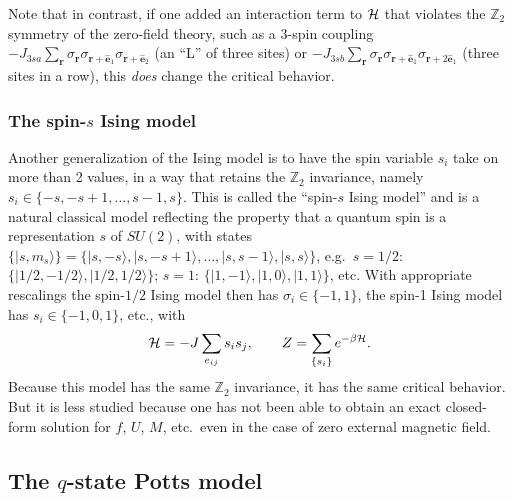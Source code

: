 Note that in contrast, if one added an interaction term to $\mathcal{H}$ that violates the $\mathbb{Z}_2$
symmetry of the zero-field theory, such as a 3-spin coupling
$-J_{3sa}\sum_{\mathbf r}\sigma_{\mathbf r}\sigma_{\mathbf r+\hat{\mathbf e}_1}\sigma_{\mathbf r+\hat{\mathbf e}_2}$
(an ``L'' of three sites) or
$-J_{3sb}\sum_{\mathbf r}\sigma_{\mathbf r}\sigma_{\mathbf r+\hat{\mathbf e}_1}\sigma_{\mathbf r+2\hat{\mathbf e}_1}$
(three sites in a row), this \emph{does} change the critical behavior.

\subsubsection*{The spin-\texorpdfstring{$s$}{s} Ising model}

Another generalization of the Ising model is to have the spin variable $s_i$ take on more than 2 values,
in a way that retains the $\mathbb{Z}_2$ invariance, namely $s_i\in\{-s,-s+1,\ldots,s-1,s\}$. This is
called the ``spin-$s$ Ising model'' and is a natural classical model reflecting the property that a
quantum spin is a representation $s$ of $SU(2)$, with states
$\{|s,m_s\rangle\} = \{|s,-s\rangle,|s,-s+1\rangle,\ldots,|s,s-1\rangle,|s,s\rangle\}$, e.g.\
$s = 1/2$: $\{|1/2,-1/2\rangle,|1/2,1/2\rangle\}$; $s = 1$:
$\{|1,-1\rangle,|1,0\rangle,|1,1\rangle\}$, etc. With appropriate rescalings the spin-$1/2$ Ising
model then has $\sigma_i\in\{-1,1\}$, the spin-1 Ising model has $s_i\in\{-1,0,1\}$, etc., with
\begin{equation}
  \mathcal{H} = -J\sum_{e_{ij}}s_is_j,\qquad Z = \sum_{\{s_i\}}e^{-\beta\mathcal{H}}.
\end{equation}
Because this model has the same $\mathbb{Z}_2$ invariance, it has the same critical behavior. But it is
less studied because one has not been able to obtain an exact closed-form solution for $f$, $U$, $M$,
etc.\ even in the case of zero external magnetic field.

\subsection{The \texorpdfstring{$q$}{q}-state Potts model}


